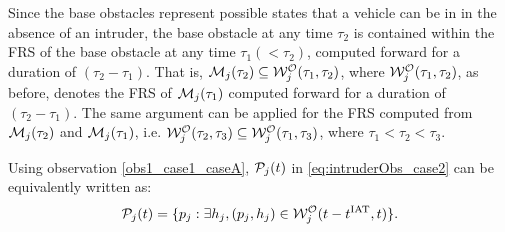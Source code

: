 \begin{itemize}[leftmargin=*]
\begin{observation} \label{obs1_case1_caseA}
Since the base obstacles represent possible states that a vehicle can be in in the absence of an intruder, the base obstacle at any time $\tau_2$ is contained within the FRS of the base obstacle at any time $\tau_1 (< \tau_2)$, computed forward for a duration of $(\tau_2-\tau_1).$ That is, $\mathcal{M}_j(\tau_2) \subseteq \mathcal{W}_{j}^{\mathcal{O}}(\tau_1, \tau_2)$, where $\mathcal{W}_{j}^{\mathcal{O}}(\tau_1, \tau_2)$, as before, denotes the FRS of $\mathcal{M}_j(\tau_1)$ computed forward for a duration of $(\tau_2-\tau_1)$. The same argument can be applied for the FRS computed from $\mathcal{M}_j(\tau_2)$ and $\mathcal{M}_j(\tau_1)$, i.e. $\mathcal{W}_{j}^{\mathcal{O}}(\tau_2, \tau_3) \subseteq \mathcal{W}_{j}^{\mathcal{O}}(\tau_1, \tau_3)$, where $\tau_1 < \tau_2 < \tau_3$.
\end{observation}

Using observation \ref{obs1_case1_caseA}, $\mathcal{P}_j(t)$ in \eqref{eq:intruderObs_case2} can be equivalently written as:
\begin{equation} \label{eq:intruderObs_case1_caseA_inter}
\pfrs_j(t) = \{p_j: \exists \npos_j, (p_j, \npos_j) \in \frs_{j}^{\mathcal{O}}(t-\iat, t) \}.
\end{equation}


\end{itemize}
